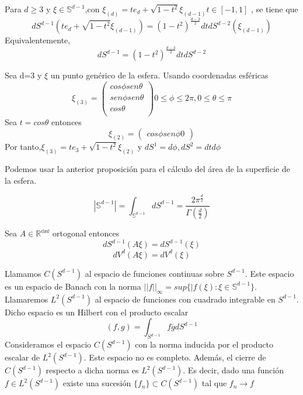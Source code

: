 \begin{prop}Para $d \ge 3$ y $\xi \in \mathds{S}^{d-1}$,con $\xi_{(d)} = te_d+\sqrt{1-t^2}\xi_{(d-1)} t\in[-1,1]$ , se tiene que
	$$
	dS^{d-1}(te_d+\sqrt{1-t^2}\xi_{(d-1)}) = (1-t^2)^{\frac{d-3}{2}}dt  dS^{d-2}(\xi_{(d-1)})
	$$
	Equivalentemente,
	$$
	dS^{d-1} = (1-t^2)^{\frac{d-3}{2}}dt dS^{d-2}
	$$
\end{prop}
\begin{example}Sea d=3 y $\xi$ un punto genérico de la esfera. Usando coordenadas esféricas $$
	\xi_{(3)}=\begin{pmatrix}
	cos\phi sen\theta\\
	sen\phi sen\theta\\
	cos\theta\\
	\end{pmatrix}
	0 \le \phi \le 2\pi , 0 \le \theta \le \pi
	$$
Sea $t=cos\theta$ entonces
$$
\xi_{(2)} = \begin{pmatrix}
cos\phi
sen\phi
0
\end{pmatrix}
$$
Por tanto,$ \xi_{(3)} = te_3 + \sqrt{1-t^2} \xi_{(2)}$ y $dS^1 = d\phi , dS^2 = dtd\phi$

\end{example}
Podemos usar la anterior proposición para el cálculo del área de la superficie de la esfera.
\begin{prop}
$$
|\mathds{S}^{d-1}| = \int_{\mathds{S}^{d-1}} dS^{d-1} = \frac{2\pi^\frac{d}{2}}{\Gamma(\frac{d}{2})}
$$
\end{prop} 

\begin{prop}
	Sea $A\in\mathds{R^{dxd}}$ ortogonal entonces
	$$ dS^{d-1}(A\xi) =  dS^{d-1}(\xi)$$
	$$ dV^{d}(A\xi) =  dV^{d}(\xi)$$
\end{prop}

Llamamos $C(S^{d-1})$ al espacio de funciones continuas sobre  $S^{d-1}$. Este espacio es un espacio de Banach con la norma $ ||f||_\infty = sup \{ |f(\xi) : \xi\in \mathds{S}^{d-1}\}$. Llamaremos $L^2(S^{d-1})$ al espacio de funciones con cuadrado integrable en $S^{d-1}$. Dicho espacio es un Hilbert con el producto escalar$$ (f,g) = \int_{S^{d-1}} f\overline{g} dS^{d-1}
$$
Consideramos el espacio $C(S^{d-1})$ con la norma inducida por el producto escalar de $L^2(S^{d-1})$. Este espacio no es completo. Además, el cierre de $C(S^{d-1})$ respecto a dicha norma es $L^2(S^{d-1})$. Es decir, dado una función $f\in L^2(S^{d-1})$ existe una sucesión $\{f_n\} \subset C(S^{d-1})$ tal que ${f_n}\to f$

